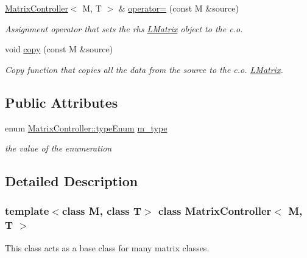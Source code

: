 \begin{DoxyCompactItemize}
\mbox{\hyperlink{class_matrix_controller}{Matrix\+Controller}}$<$ M, T $>$ \& \mbox{\hyperlink{class_matrix_controller_ad7a26021ed274944adbc4df6c068de35}{operator=}} (const M \&source)
\begin{DoxyCompactList}\small\item\em Assignment operator that sets the rhs \mbox{\hyperlink{class_l_matrix}{L\+Matrix}} object to the c.\+o. \end{DoxyCompactList}\item 
void \mbox{\hyperlink{class_matrix_controller_aced34d0065a5df3d3fadb140a782a22b}{copy}} (const M \&source)
\begin{DoxyCompactList}\small\item\em Copy function that copies all the data from the source to the c.\+o. \mbox{\hyperlink{class_l_matrix}{L\+Matrix}}. \end{DoxyCompactList}\end{DoxyCompactItemize}
\subsection*{Public Attributes}
\begin{DoxyCompactItemize}
\item 
enum \mbox{\hyperlink{class_matrix_controller_aca66836084cbc7807dbaea879ac31fc7}{Matrix\+Controller\+::type\+Enum}} \mbox{\hyperlink{class_matrix_controller_aacbda7580c5c72ee63cf49ada64b77e7}{m\+\_\+type}}
\begin{DoxyCompactList}\small\item\em the value of the enumeration \end{DoxyCompactList}\end{DoxyCompactItemize}


\subsection{Detailed Description}
\subsubsection*{template$<$class M, class T$>$\newline
class Matrix\+Controller$<$ M, T $>$}

This class acts as a base class for many matrix classes. 

